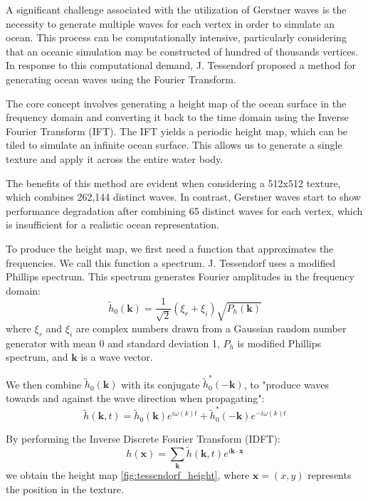 \vspace{0.3cm}
A significant challenge associated with the utilization of Gerstner waves is the necessity to generate multiple waves for each vertex in order to simulate an ocean. This process can be computationally intensive, particularly considering that an oceanic simulation may be constructed of hundred of thousands vertices. In response to this computational demand, J. Tessendorf \cite{tessendorf2001} proposed a method for generating ocean waves using the Fourier Transform.

The core concept involves generating a height map of the ocean surface in the frequency domain and converting it back to the time domain using the Inverse Fourier Transform (IFT). The IFT yields a periodic height map, which can be tiled to simulate an infinite ocean surface. This allows us to generate a single texture and apply it across the entire water body.

The benefits of this method are evident when considering a 512x512 texture, which combines 262,144 distinct waves. In contrast, Gerstner waves start to show performance degradation after combining 65 distinct waves for each vertex, which is insufficient for a realistic ocean representation.

To produce the height map, we first need a function that approximates the frequencies. We call this function a spectrum. J. Tessendorf uses a modified Phillips spectrum. This spectrum generates Fourier amplitudes in the frequency domain:
\begin{equation}
    \tilde{h}_0(\mathbf{k}) = \frac{1}{\sqrt{2}}(\xi_r + \xi_i)\sqrt{P_h(\mathbf{k})}
    \label{eq:fouier_amplitudes}
\end{equation}
where $\xi_r$ and $\xi_i$ are complex numbers drawn from a Gaussian random number generator with mean 0 and standard deviation 1, $P_h$ is modified Phillips spectrum, and $\mathbf{k}$ is a wave vector.

We then combine $\tilde{h}_0(\mathbf{k})$ with its conjugate $\tilde{h}^{*}_0(-\mathbf{k})$, to "produce waves towards and against the wave direction when propagating"\cite{horvath2015}:
\begin{equation}
    \tilde{h}(\mathbf{k}, t) = \tilde{h}_0(\mathbf{k})e^{i\omega(k)t}+\tilde{h}^{*}_0(-\mathbf{k})e^{-i\omega(k)t}
    \label{eq:combined_amplitudes}
\end{equation}

By performing the Inverse Discrete Fourier Transform (IDFT):
\begin{equation}
    h(\mathbf{x}) = \sum_{\mathbf{k}} \tilde{h}(\mathbf{k}, t)e^{i\mathbf{k}\cdot\mathbf{x}}
    \label{eq:height_map}
\end{equation}
we obtain the height map \ref{fig:tessendorf_height}, where $\mathbf{x}=(x,y)$ represents the position in the texture.

